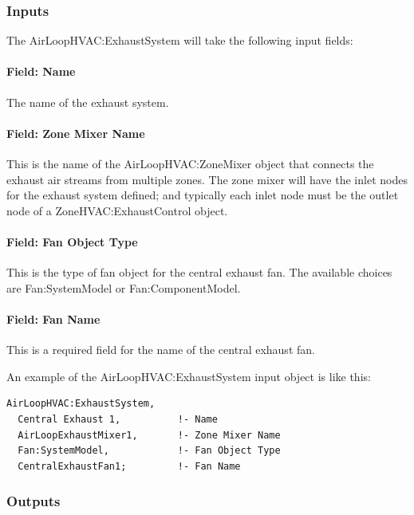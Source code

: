 \subsubsection{Inputs}

The AirLoopHVAC:ExhaustSystem will take the following input fields:

\paragraph{Field: Name}

The name of the exhaust system.

\paragraph{Field: Zone Mixer Name}

This is the name of the AirLoopHVAC:ZoneMixer object that connects the exhaust air streams from multiple zones. The zone mixer will have the inlet nodes for the exhaust system defined; and typically each inlet node must be the outlet node of a ZoneHVAC:ExhaustControl object.

\paragraph{Field: Fan Object Type}

This is the type of fan object for the central exhaust fan. The available choices are Fan:SystemModel or Fan:ComponentModel.

\paragraph{Field: Fan Name}

This is a required field for the name of the central exhaust fan.

An example of the AirLoopHVAC:ExhaustSystem input object is like this:

\begin{lstlisting}
AirLoopHVAC:ExhaustSystem,
  Central Exhaust 1,          !- Name
  AirLoopExhaustMixer1,       !- Zone Mixer Name
  Fan:SystemModel,            !- Fan Object Type
  CentralExhaustFan1;         !- Fan Name
\end{lstlisting}

\subsubsection{Outputs}

